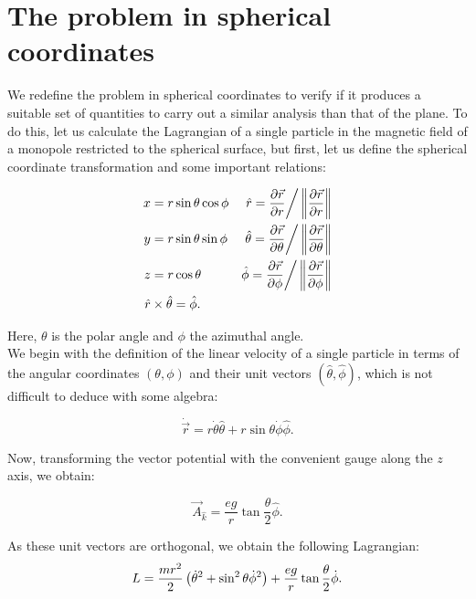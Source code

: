 \section{The problem in spherical coordinates}
We redefine the problem in spherical coordinates to verify if it produces a suitable set of quantities to carry out a similar analysis than that of the plane. To do this, let us calculate the Lagrangian of a single particle in the magnetic field of a monopole restricted to the spherical surface, but first, let us define the spherical coordinate transformation and some important relations:

\begin{align*}
x &= r\sin{\theta}\cos{\phi} & \hat{r} = \frac{\partial \vec{r}}{\partial r}\bigg/\left\lVert \frac{\partial \vec{r}}{\partial r} \right\rVert\\
y &= r\sin{\theta}\sin{\phi} & \hat{\theta} = \frac{\partial \vec{r}}{\partial \theta}\bigg/\left\lVert \frac{\partial \vec{r}}{\partial \theta} \right\rVert \\
z &= r\cos{\theta} & \hat{\phi} = \frac{\partial \vec{r}}{\partial \phi}\bigg/\left\lVert \frac{\partial \vec{r}}{\partial \phi} \right\rVert\\
\hat{r}&\times \hat{\theta} = \hat{\phi}.
\end{align*}

Here, $\theta$ is the polar angle and $\phi$ the azimuthal angle.\\

We begin with the definition of the  linear velocity of a single particle in terms of the angular coordinates $(\theta,\phi)$ and their unit vectors $(\hat{\theta},\hat{\phi})$, which is not difficult to deduce with some algebra:

\begin{equation}
\dot{\vec{r}} = r\dot{\theta}\hat{\theta} + r\sin{\theta}\dot{\phi}\hat{\phi}.
\end{equation}

Now, transforming the vector potential with the convenient gauge along the $z$ axis, we obtain:

\begin{equation*}
\vec{A}_{\hat{k}} = \frac{eg}{r}\tan{\frac{\theta}{2}}\hat{\phi}.
\end{equation*}

As these unit vectors are orthogonal, we obtain the following Lagrangian:\\

\begin{equation*}
L = \frac{mr^2}{2}\left( \dot{\theta}^2 + \sin^2\theta \dot{\phi}^2 \right) + \frac{eg}{r}\tan{\frac{\theta}{2}\dot{\phi}}.
\end{equation*}

